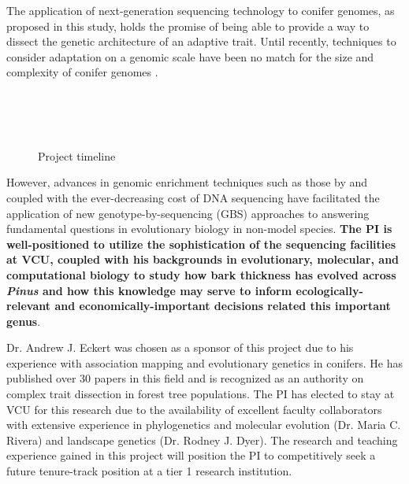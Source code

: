 The application of next-generation sequencing technology to conifer genomes, as proposed in this study, holds the promise of 
being able to provide a way to dissect the genetic architecture of an adaptive trait.  Until recently, techniques 
to consider adaptation on a genomic scale have been no match for the size and complexity of conifer genomes \citep{Mackay:2012hr}.  
\begin{figure}
\setlength{\abovecaptionskip}{5pt}
	\begin{ganttchart}[vgrid]{1}{12}
	\\
	
	\\
	
	\\

	\end{ganttchart}
\caption{Project timeline}
\vspace{-10pt}
\label{f:timeline}
\end{figure}
However, advances in genomic enrichment techniques such as those by \citet{Parchman:2012ca} and \citet{Willing:2011jb} 
coupled with the ever-decreasing cost of DNA sequencing have facilitated the application of new genotype-by-sequencing (GBS) 
approaches to answering fundamental questions in evolutionary biology in non-model species.  \textbf{The PI is well-positioned 
to utilize the sophistication of the sequencing facilities at VCU, coupled with his backgrounds in evolutionary, molecular, and 
computational biology to study how bark thickness has evolved across \emph{Pinus} and how this knowledge may serve to 
inform ecologically-relevant and economically-important decisions related this important genus}.

Dr. Andrew J. Eckert was chosen as a sponsor of this project due to his experience with association mapping 
and evolutionary genetics in conifers. He has published over 30 papers in this field and is recognized as an authority 
on complex trait dissection in forest tree populations.  The PI has elected to stay at VCU for this research due to the availability 
of excellent faculty collaborators with extensive experience in phylogenetics and molecular evolution (Dr. Maria C. Rivera) and 
landscape genetics (Dr. Rodney J. Dyer).  The research and teaching experience gained in this project will position the PI to 
competitively seek a future tenure-track position at a tier 1 research institution.      

